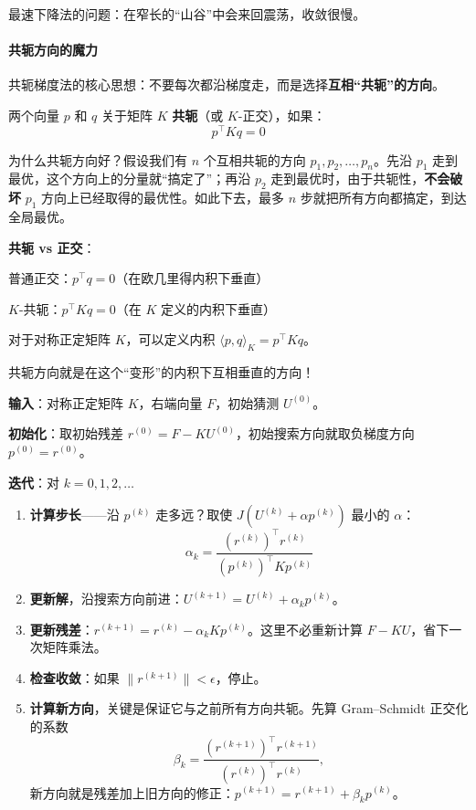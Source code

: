 最速下降法的问题：在窄长的“山谷”中会来回震荡，收敛很慢。

\paragraph{共轭方向的魔力}

共轭梯度法的核心思想：不要每次都沿梯度走，而是选择\textbf{互相“共轭”的方向}。

\begin{definition}[共轭方向]
两个向量 $p$ 和 $q$ 关于矩阵 $K$ \textbf{共轭}（或 $K$-正交），如果：
\[
p^\top K q = 0
\]
\end{definition}

为什么共轭方向好？假设我们有 $n$ 个互相共轭的方向 $p_1, p_2, \ldots, p_n$。先沿 $p_1$ 走到最优，这个方向上的分量就“搞定了”；再沿 $p_2$ 走到最优时，由于共轭性，\textbf{不会破坏} $p_1$ 方向上已经取得的最优性。如此下去，最多 $n$ 步就把所有方向都搞定，到达全局最优。

\begin{insightbox}
\textbf{共轭 vs 正交}：

普通正交：$p^\top q = 0$（在欧几里得内积下垂直）

$K$-共轭：$p^\top K q = 0$（在 $K$ 定义的内积下垂直）

对于对称正定矩阵 $K$，可以定义内积 $\langle p, q \rangle_K = p^\top K q$。

共轭方向就是在这个“变形”的内积下互相垂直的方向！
\end{insightbox}


\begin{tcolorbox}[colback=gray!5, colframe=gray!60, title=共轭梯度法（CG）]
\textbf{输入}：对称正定矩阵 $K$，右端向量 $F$，初始猜测 $U^{(0)}$。

\textbf{初始化}：取初始残差 $r^{(0)} = F - K U^{(0)}$，初始搜索方向就取负梯度方向 $p^{(0)} = r^{(0)}$。

\textbf{迭代}：对 $k = 0, 1, 2, \ldots$
\begin{enumerate}
    \item \textbf{计算步长}——沿 $p^{(k)}$ 走多远？取使 $J(U^{(k)} + \alpha p^{(k)})$ 最小的 $\alpha$：
    \[
    \alpha_k = \frac{(r^{(k)})^\top r^{(k)}}{(p^{(k)})^\top K p^{(k)}}
    \]
    \item \textbf{更新解}，沿搜索方向前进：$U^{(k+1)} = U^{(k)} + \alpha_k p^{(k)}$。
    \item \textbf{更新残差}：$r^{(k+1)} = r^{(k)} - \alpha_k K p^{(k)}$。这里不必重新计算 $F - KU$，省下一次矩阵乘法。
    \item \textbf{检查收敛}：如果 $\|r^{(k+1)}\| < \epsilon$，停止。
    \item \textbf{计算新方向}，关键是保证它与之前所有方向共轭。先算 Gram--Schmidt 正交化的系数
    \[
    \beta_k = \frac{(r^{(k+1)})^\top r^{(k+1)}}{(r^{(k)})^\top r^{(k)}} ,
    \]
    新方向就是残差加上旧方向的修正：$p^{(k+1)} = r^{(k+1)} + \beta_k p^{(k)}$。
\end{enumerate}
\end{tcolorbox}

